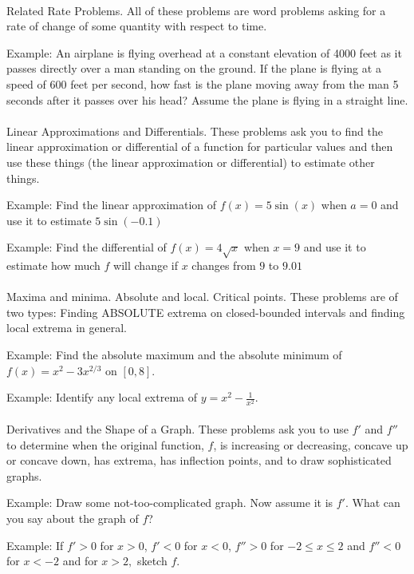 \documentclass[11pt,fleqn]{article}
\begin{document}
\noindent {}\\
Related Rate Problems. All of these problems are word problems asking for a rate of change of some quantity with respect to time. 

Example:  An airplane is flying overhead at a constant elevation of 4000 feet as it passes directly over a man standing on the ground. If the plane is flying at a speed of 600 feet per second, how fast is the plane moving away from the man 5 seconds after it passes over his head? Assume the plane is flying in a straight line.\\

\noindent {}\\
Linear Approximations and Differentials. These problems ask you to find the linear approximation or differential of a function for particular values and then use these things (the linear approximation or differential) to estimate other things.

Example:  Find the linear approximation of $f(x)=5 \sin (x)$ when $a=0$ and use it to estimate $5 \sin (-0.1)$

Example:  Find the differential of $f(x)=4 \sqrt{x}$ when $x=9$ and use it to estimate  how much $f$ will change if $x$ changes from $9$ to $9.01$\\


\noindent {}\\
Maxima and minima. Absolute and local. Critical points. These problems are of two types: Finding ABSOLUTE extrema on closed-bounded intervals and finding local extrema in general.

Example: Find the absolute maximum and the absolute minimum of $f(x)=x^2-3x^{2/3}$ on $[0,8].$

Example: Identify any local extrema of $y=x^2- \frac{1}{x^2}.$\\

\noindent {}\\
Derivatives and the Shape of a Graph. These problems ask you to use $f'$ and $f''$ to determine when the original function, $f$, is increasing or decreasing, concave up or concave down, has extrema, has inflection points, and to draw sophisticated graphs.

Example: Draw some not-too-complicated graph. Now assume it is $f'$. What can you say about the graph of $f$?

Example: If $f' >0$ for $x>0$, $f' <0$ for $x<0$, $f'' > 0$ for $-2 \leq x \leq 2$ and $f'' < 0$ for $x<-2$ and for $x>2,$ sketch $f.$
\end{document}
